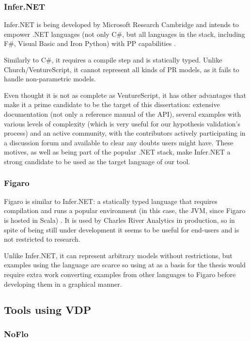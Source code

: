\subsubsection{Infer.NET}

Infer.NET is being developed by Microsoft Research Cambridge and intends to
empower .NET languages (not only C#, but all languages in the stack, including
F#, Visual Basic and Iron Python) with PP capabilities \cite{InferNET14}.

Similarly to C#, it requires a compile step and is statically typed. Unlike
Church/VentureScript, it cannot represent all kinds of PR models, as it fails to handle
non-parametric models.

Even thought it is not as complete as VentureScript, it has other advantages
that make it a prime candidate to be the target of this dissertation: extensive
documentation (not only a reference manual of the API), several examples with
various levels of complexity (which is very useful for our hypothesis validation's
process) and an active community, with the contributors
actively participating in a discussion forum and available to clear any doubts
users might have. These motives, as well as being part of the popular .NET
stack, make Infer.NET a strong candidate to be used as the target language of our tool.

\subsubsection{Figaro}

Figaro is similar to Infer.NET: a statically typed language that requires compilation
and runs a popular environment (in this case, the JVM, since Figaro is hosted in
Scala) \cite{figarot}. It is used by Charles River Analytics in production, so
in spite of being still under development it seems to be useful for end-users and
is not restricted to research.

Unlike Infer.NET, it can represent arbitrary models without restrictions, but
examples using the language are scarce so using at as a basis for the thesis
would require extra work converting examples from other languages to Figaro
before developing them in a graphical manner.

\subsection{Tools using VDP}
\label{sec:sotavdp}

\subsubsection{NoFlo}
\label{sec:noflo}

